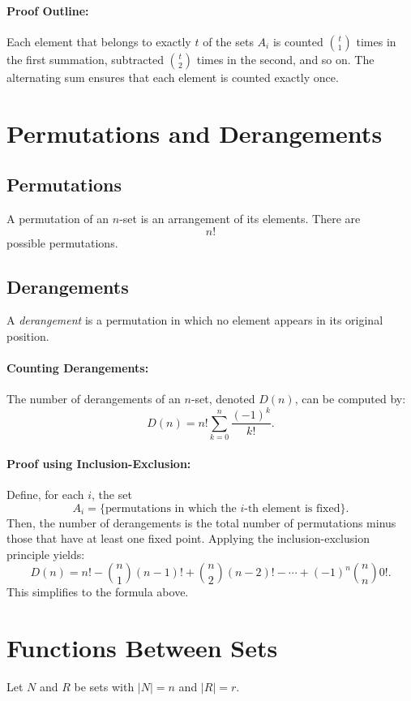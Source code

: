 \documentclass{article}
\begin{document}
\paragraph{Proof Outline:}  
Each element that belongs to exactly $t$ of the sets $A_i$ is counted $\binom{t}{1}$ times in the first summation, subtracted $\binom{t}{2}$ times in the second, and so on. The alternating sum ensures that each element is counted exactly once.

\section{Permutations and Derangements}

\subsection{Permutations}
A permutation of an $n$-set is an arrangement of its elements. There are
\[
n!
\]
possible permutations.

\subsection{Derangements}
A \emph{derangement} is a permutation in which no element appears in its original position.  
\paragraph{Counting Derangements:}  
The number of derangements of an $n$-set, denoted $D(n)$, can be computed by:
\[
D(n) = n! \sum_{k=0}^{n} \frac{(-1)^k}{k!}.
\]
\paragraph{Proof using Inclusion-Exclusion:}  
Define, for each $i$, the set
\[
A_i = \{\text{permutations in which the } i\text{-th element is fixed}\}.
\]
Then, the number of derangements is the total number of permutations minus those that have at least one fixed point. Applying the inclusion-exclusion principle yields:
\[
D(n) = n! - \binom{n}{1}(n-1)! + \binom{n}{2}(n-2)! - \cdots + (-1)^n \binom{n}{n}0!.
\]
This simplifies to the formula above.

\section{Functions Between Sets}

Let $N$ and $R$ be sets with $|N| = n$ and $|R| = r$.
\end{document}
